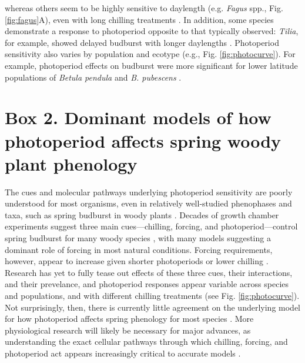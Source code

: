 \documentclass{article}
\begin{document}
whereas others seem to be highly sensitive to daylength (e.g. \emph{Fagus} spp., Fig. \ref{fig:fagus}A), even with long chilling treatments \citep{zohner2016}. In addition, some species demonstrate a response to photoperiod opposite to that typically observed: \emph{Tilia}, for example, showed delayed budburst with longer daylengths \citep[Fig. \ref{fig:photocurve},][]{Ashby:1962aa}. %
Photoperiod sensitivity also varies by population and ecotype (e.g., Fig. \ref{fig:photocurve}). For example, photoperiod effects on budburst were more significant for lower latitude populations of \emph{Betula pendula} and \emph{B. pubescens} \citep{Partanen:2005aa}. 


\section*{Box 2. Dominant models of how photoperiod affects spring woody plant phenology}
\par The cues and molecular pathways underlying photoperiod sensitivity are poorly understood for most organisms, even in relatively well-studied phenophases and taxa, such as spring budburst in woody plants \citep{ding2016}. Decades of growth chamber experiments suggest three main cues---chilling, forcing, and photoperiod---control spring budburst for many woody species \citep{flynn2018,Heide:2008aa, zohner2016}, with many models suggesting a dominant role of forcing in most natural conditions. Forcing requirements, however, appear to increase given shorter photoperiods or lower chilling \citep{chuine2010,Caffarra:2011qf}. Research has yet to fully tease out effects of these three cues, their interactions, and their prevelance, and photoperiod responses appear variable across species and populations, and with different chilling treatments (see Fig. \ref{fig:photocurve}). Not surprisingly, then, there is currently little agreement on the underlying model for how photoperiod affects spring phenology for most species \citep{chuine2016,hanninen2019}. More physiological research will likely be necessary for major advances, as understanding the exact cellular pathways through which chilling, forcing, and photoperiod act appears increasingly critical to accurate models \citep{vanderschoot2014,hanninen2019}. 
\end{document}

